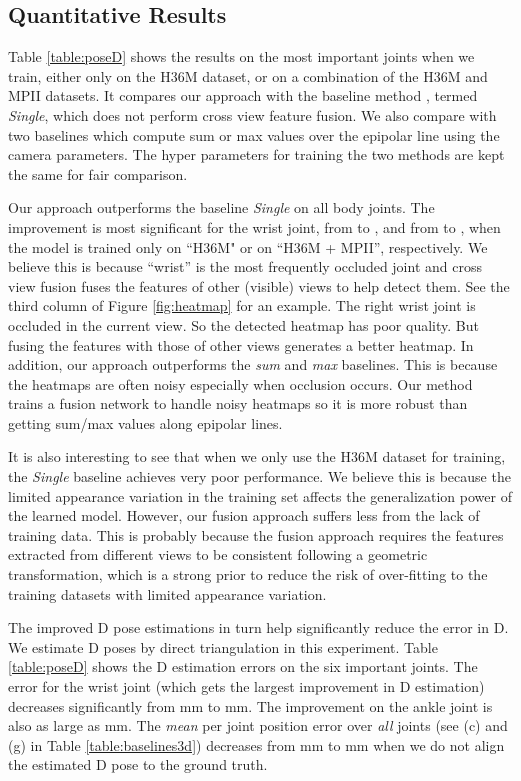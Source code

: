 \documentclass[10pt,twocolumn,letterpaper]{article}
\begin{document}
\subsection{Quantitative Results}
Table \ref{table:poseD} shows the results on the most important joints when we train, either only on the H36M dataset, or on a combination of the H36M and MPII datasets. It compares our approach with the baseline method \cite{simplebaselines}, termed \textit{Single}, which does not perform cross view feature fusion. We also compare with two baselines which compute sum or max values over the epipolar line using the camera parameters. The hyper parameters for training the two methods are kept the same for fair comparison.

Our approach outperforms the baseline \textit{Single} on all body joints. The improvement is most significant for the wrist joint, from  to , and from  to , when the model is trained only on ``H36M" or on ``H36M + MPII'', respectively. We believe this is because ``wrist'' is the most frequently occluded joint and cross view fusion fuses the features of other (visible) views to help detect them. See the third column of Figure \ref{fig:heatmap} for an example. The right wrist joint is occluded in the current view. So the detected heatmap has poor quality. But fusing the features with those of other views generates a better heatmap. In addition, our approach outperforms the \textit{sum} and \textit{max} baselines. This is because the heatmaps are often noisy especially when occlusion occurs. Our method trains a fusion network to handle noisy heatmaps so it is more robust than getting sum/max values along epipolar lines.



It is also interesting to see that when we only use the H36M dataset for training, the \textit{Single} baseline achieves very poor performance. We believe this is because the limited appearance variation in the training set affects the generalization power of the learned model. However, our fusion approach suffers less from the lack of training data. This is probably because the fusion approach requires the features extracted from different views to be consistent following a geometric transformation, which is a strong prior to reduce the risk of over-fitting to the training datasets with limited appearance variation. 

The improved D pose estimations in turn help significantly reduce the error in D. We estimate D poses by direct triangulation in this experiment. Table \ref{table:poseD} shows the D estimation errors on the six important joints.  The error for the wrist joint (which gets the largest improvement in D estimation) decreases significantly from mm to mm. The improvement on the ankle joint is also as large as mm. The \textit{mean} per joint position error over \textit{all} joints (see (c) and (g) in Table \ref{table:baselines3d}) decreases from mm to mm when we do not align the estimated D pose to the ground truth. 
\end{document}
